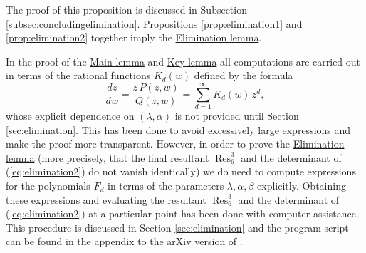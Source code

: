 The proof of this proposition is discussed in Subsection \ref{subsec:concludingelimination}. Propositions \ref{prop:elimination1} and \ref{prop:elimination2} together imply the \hyperref[lemma:elimination]{Elimination lemma}.

\begin{remark}
In the proof of the \hyperref[lemma:main]{Main lemma} and \hyperref[lemma:key]{Key lemma} all computations are carried out in terms of the rational functions $K_d(w)$ defined by the formula
\[ \frac{dz}{dw}=\frac{z\,P(z,w)}{Q(z,w)}=\sum_{d=1}^{\infty}K_d(w)\,z^d, \]
whose explicit dependence on $(\lambda,\alpha)$ is not provided until Section \ref{sec:elimination}. This has been done to avoid excessively large expressions and make the proof more transparent. However, in order to prove the \hyperref[lemma:elimination]{Elimination lemma} (more precisely, that the final resultant $\operatorname{Res}^3_6$ and the determinant of (\ref{eq:elimination2}) do not vanish identically) we do need to compute expressions for the polynomials $F_d$ in terms of the parameters $\lambda,\alpha,\beta$ explicitly. Obtaining these expressions and evaluating the resultant $\operatorname{Res}^3_6$ and the determinant of (\ref{eq:elimination2}) at a particular point has been done with computer assistance. This procedure is discussed in Section \ref{sec:elimination} and the program script can be found in the appendix to the arXiv version of \cite{UtmostRigidity}.
\end{remark}






















